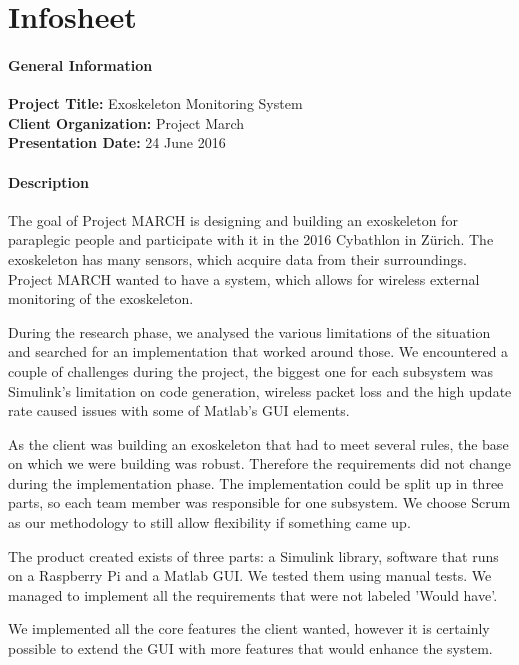 \chapter{Infosheet}
\pagebreak
\begin{small}
\subsubsection{General Information}
{\bfseries Project Title:} Exoskeleton Monitoring System\\
{\bfseries Client Organization:} Project March\\
{\bfseries Presentation Date:} 24 June 2016

\subsubsection{Description}
The goal of Project MARCH is designing and building an exoskeleton for paraplegic people and participate with it in the 2016 Cybathlon in Zürich. The exoskeleton has many sensors, which acquire data from their surroundings. Project MARCH wanted to have a system, which allows for wireless external monitoring of the exoskeleton. 

During the research phase, we analysed the various limitations of the situation and searched for an implementation that worked around those. We encountered a couple of challenges during the project, the biggest one for each subsystem was Simulink's limitation on code generation, wireless packet loss and the high update rate caused issues with some of Matlab's GUI elements.  

As the client was building an exoskeleton that had to meet several rules, the base on which we were building was robust. Therefore the requirements did not change during the implementation phase. The implementation could be split up in three parts, so each team member was responsible for one subsystem. We choose Scrum as our methodology to still allow flexibility if something came up.

The product created exists of three parts: a Simulink library, software that runs on a Raspberry Pi and a Matlab GUI. We tested them using manual tests. We managed to implement all the requirements that were not labeled 'Would have'. 

We implemented all the core features the client wanted, however it is certainly possible to extend the GUI with more features that would enhance the system.


\end{small}
